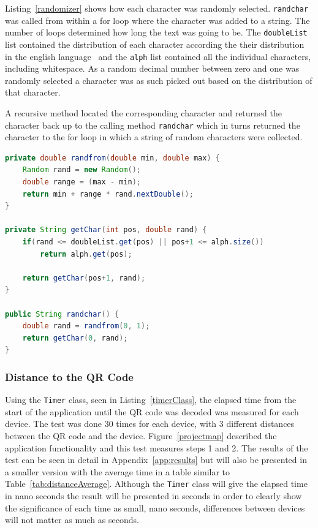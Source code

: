 Listing~\ref{randomizer} shows how each character was randomly selected. \texttt{randchar} was called from within a for loop where the character was added to a string. The number of loops determined how long the text was going to be. The \texttt{doubleList} list contained the distribution of each character according the their distribution in the english language~\cite{englishTextStat} and the \texttt{alph} list contained all the individual characters, including whitespace. As a random decimal number between zero and one was randomly selected a character was as such picked out based on the distribution of that character.

A recursive method located the corresponding character and returned the character back up to the calling method \texttt{randchar} which in turns returned the character to the for loop in which a string of random characters were collected.

\begin{lstlisting}[language=Java, caption={The randomizer class}, label=randomizer]
private double randfrom(double min, double max) {
	Random rand = new Random();
	double range = (max - min);
	return min + range * rand.nextDouble();
}

private String getChar(int pos, double rand) {
	if(rand <= doubleList.get(pos) || pos+1 <= alph.size())
		return alph.get(pos);
		
	return getChar(pos+1, rand);
}

public String randchar() {
	double rand = randfrom(0, 1);
	return getChar(0, rand);
}
\end{lstlisting}

\subsubsection{Distance to the QR Code}

Using the \texttt{Timer} class, seen in Listing~\ref{timerClass}, the elapsed time from the start of the application until the QR code was decoded was measured for each device. The test was done 30 times for each device, with 3 different distances between the QR code and the device. Figure~\ref{projectmap} described the application functionality and this test measures steps 1 and 2.  The results of the test can be seen in detail in Appendix~\ref{app:results} but will also be presented in a smaller version with the average time in a table similar to Table~\ref{tab:distanceAverage}. Although the \texttt{Timer} class will give the elapsed time in nano seconds the result will be presented in seconds in order to clearly show the significance of each time as small, nano seconds, differences between devices will not matter as much as seconds.

